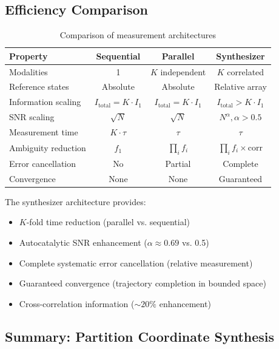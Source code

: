 \subsection{Efficiency Comparison}

\begin{table}[H]
\centering
\caption{Comparison of measurement architectures}
\label{tab:architecture_comparison}
\begin{tabular}{lccc}
\toprule
\textbf{Property} & \textbf{Sequential} & \textbf{Parallel} & \textbf{Synthesizer} \\
\midrule
Modalities & 1 & $K$ independent & $K$ correlated \\
Reference states & Absolute & Absolute & Relative array \\
Information scaling & $I_{\text{total}} = K \cdot I_1$ & $I_{\text{total}} = K \cdot I_1$ & $I_{\text{total}} > K \cdot I_1$ \\
SNR scaling & $\sqrt{N}$ & $\sqrt{N}$ & $N^{\alpha}, \alpha > 0.5$ \\
Measurement time & $K \cdot \tau$ & $\tau$ & $\tau$ \\
Ambiguity reduction & $f_1$ & $\prod_i f_i$ & $\prod_i f_i \times \text{corr}$ \\
Error cancellation & No & Partial & Complete \\
Convergence & None & None & Guaranteed \\
\bottomrule
\end{tabular}
\end{table}

The synthesizer architecture provides:
\begin{itemize}
\item $K$-fold time reduction (parallel vs. sequential)
\item Autocatalytic SNR enhancement ($\alpha \approx 0.69$ vs. 0.5)
\item Complete systematic error cancellation (relative measurement)
\item Guaranteed convergence (trajectory completion in bounded space)
\item Cross-correlation information ($\sim 20\%$ enhancement)
\end{itemize}

\subsection{Summary: Partition Coordinate Synthesis}

